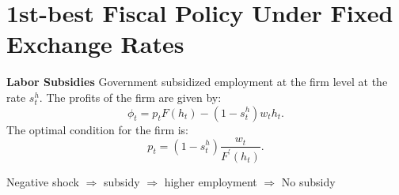 \section{1st-best Fiscal Policy Under Fixed Exchange Rates}
\textbf{Labor Subsidies}
Government subsidized employment at the firm level at the rate $s_t^h$.
The profits of the firm are given by:
\[
\phi_t = p_t F(h_t) - (1-s_t^h) w_t h_t.
\]
The optimal condition for the firm is:
\[
p_t = (1-s_t^h) \frac{w_t}{F^{\prime} (h_t)}.
\]

Negative shock $\Rightarrow$ subsidy $\Rightarrow$ higher employment $\Rightarrow$ No subsidy

